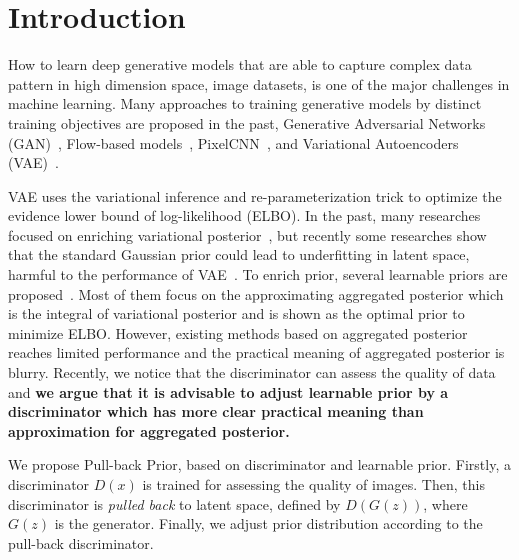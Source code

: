 \section{Introduction}

How to learn deep generative models that are able to capture complex data pattern in high dimension space, \EG image datasets, is one of the major challenges in machine learning. Many approaches to training generative models by distinct training objectives are proposed in the past, \EG Generative Adversarial Networks (GAN)~\cite{goodfellow2014generative}, Flow-based models~\cite{dinh2016density,kingma2018glow}, PixelCNN~\cite{van2016conditional}, and Variational Autoencoders (VAE)~\cite{kingma2014auto,rezende_stochastic_2014}.

VAE uses the variational inference and re-parameterization trick to optimize the evidence lower bound of log-likelihood (ELBO). In the past, many researches focused on enriching variational posterior~\cite{kingma2016improved,tomczak2016improving}, but recently some researches show that the standard Gaussian prior could lead to underfitting in latent space, harmful to the performance of VAE~\cite{tomczak2018vae}. To enrich prior, several learnable priors are proposed~\cite{tomczak2018vae,bauer2019resampled,takahashi2019variational}. Most of them focus on the approximating aggregated posterior which is the integral of variational posterior and is shown as the optimal prior to minimize ELBO. However, existing methods based on aggregated posterior reaches limited performance and the practical meaning of aggregated posterior is blurry. Recently, we notice that the discriminator can assess the quality of data and \textbf{we argue that it is advisable to adjust learnable prior by a discriminator which has more clear practical meaning than approximation for aggregated posterior. } 

We propose Pull-back Prior, based on discriminator and learnable prior. 
Firstly, a discriminator $D(x)$ is trained for assessing the quality of images. Then, this discriminator is \textit{pulled back} to latent space, defined by $D(G(z))$, where $G(z)$ is the generator. Finally, we adjust prior distribution according to the pull-back discriminator. 

